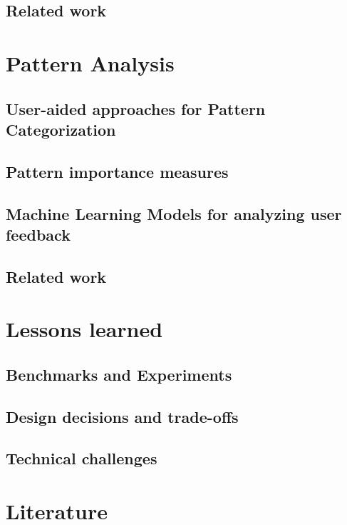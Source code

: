 \documentclass[
        a4paper,     %
        titlepage,   %
        twoside,     %
        parskip      %
        ]{scrartcl}  %
\begin{document}
    \subsection{Related work}
    \pagebreak

  \section{Pattern Analysis}
    \subsection{User-aided approaches for Pattern Categorization}
    \subsection{Pattern importance measures}
    \subsection{Machine Learning Models for analyzing user feedback}
    \subsection{Related work}
    \pagebreak

  \section{Lessons learned}
    \subsection{Benchmarks and Experiments}
    \subsection{Design decisions and trade-offs}
    \subsection{Technical challenges}
    \pagebreak

  \section{Literature}

  \clearpage
  
\end{document}
